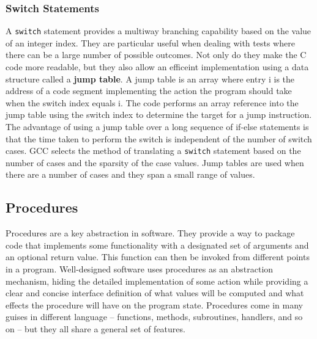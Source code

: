 \documentclass[11pt]{article}
\begin{document}
\subsubsection{Switch Statements}
\label{sec:org0b4db8f}
A \texttt{switch} statement provides a multiway branching capability based on the value of an integer index. They are particular useful when dealing with tests where there can be a large number of possible outcomes. Not only do they make the C code more readable, but they also allow an efficeint implementation using a data structure called a \textbf{jump table}. A jump table is an array where entry i is the address of a code segment implementing the action the program should take when the switch index equals i. The code performs an array reference into the jump table using the switch index to determine the target for a jump instruction. The advantage of using a jump table over a long sequence of if-else statements is that the time taken to perform the switch is independent of the number of switch cases. GCC selects the method of translating a \texttt{switch} statement based on the number of cases and the sparsity of the case values. Jump tables are used when there are a number of cases and they span a small range of values.\\


\subsection{Procedures}
\label{sec:org295b290}
Procedures are a key abstraction in software. They provide a way to package code that implements some functionality with a designated set of arguments and an optional return value. This function can then be invoked from different points in a program. Well-designed software uses procedures as an abstraction mechanism, hiding the detailed implementation of some action while providing a clear and concise interface definition of what values will be computed and what effects the procedure will have on the program state. Procedures come in many guises in different language -- functions, methods, subroutines, handlers, and so on -- but they all share a general set of features.\\
\end{document}
